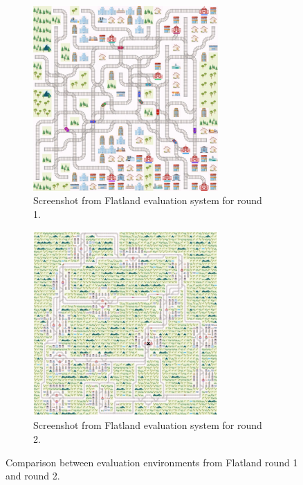 \begin{figure}[H]
	\centering
	\begin{subfigure}{.5\textwidth}
		\centering
		\includegraphics[width=200pt]{images/example_eval_round1.png}
		\caption{Screenshot from Flatland evaluation system for round 1.}
		\label{fig:eval_round1}
	\end{subfigure}%
	\begin{subfigure}{.5\textwidth}
		\centering
		\includegraphics[width=200pt]{images/example_eval_round2.png}
		\caption{Screenshot from Flatland evaluation system for round 2.}
		\label{fig:eval_round2}
	\end{subfigure}
	\caption{Comparison between evaluation environments from Flatland round 1 and round 2.}
	\label{fig:eval_comp}
\end{figure}

